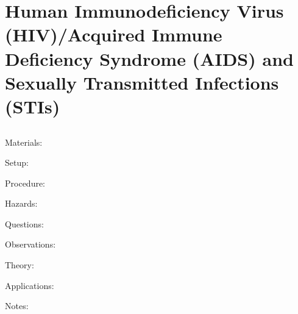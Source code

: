 \section[HIV/AIDS and STIs]{Human Immunodeficiency Virus (HIV)/Acquired Immune Deficiency Syndrome (AIDS) and Sexually Transmitted Infections (STIs)}

\begin{multicols}{2}


\section*{}


\subsection{}


\begin{description*}
\item[Materials:]{}
\item[Setup:]{}
\item[Procedure:]{}
\item[Hazards:]{}
\item[Questions:]{}
\item[Observations:]{}
\item[Theory:]{}
\item[Applications:]{}
\item[Notes:]{}
\end{description*}



\end{multicols}

\pagebreak